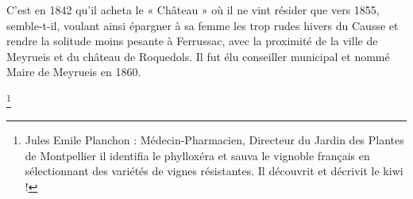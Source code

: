 C’est en 1842 qu’il acheta le « Château » où il ne vint résider que vers 1855, semble-t-il, voulant ainsi
épargner à sa femme les trop rudes hivers du Causse et rendre la solitude moins pesante à Ferrussac,
avec la proximité de la ville de Meyrueis et du château de Roquedols.
Il fut élu conseiller municipal et nommé Maire de Meyrueis en 1860.

\footnote{Jules Emile Planchon : Médecin-Pharmacien, Directeur du Jardin des Plantes de Montpellier il identifia le
phylloxéra et sauva le vignoble français en sélectionnant des variétés de vignes résistantes. Il découvrit et
décrivit le kiwi !}
